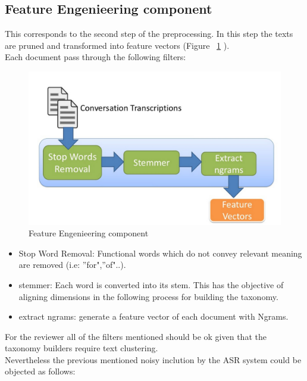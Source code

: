 \documentclass[4pt,a4paper]{article}
\begin{document}
\subsection{Feature Engenieering component}

This corresponds to the second step of the preprocessing. In this step the texts are pruned and transformed into feature vectors (Figure ~\ref{fig:eng_component} ).\\
Each document pass through the following filters:

\begin{figure}[]
  \centering
    \includegraphics[scale=0.2]{pics/eng_component.jpg}
    \caption{Feature Engenieering component}
   \label{fig:eng_component}  
\end{figure}

\begin{itemize}
	\item Stop Word Removal: Functional words which do not convey relevant meaning are removed (i.e: ''for",''of"..).
	
	\item stemmer: Each word is converted into its stem. This has the objective of aligning dimensions in the following process for building the taxonomy.
	
	\item extract ngrams:  generate a feature vector of each document with Ngrams.
\end{itemize}

For the reviewer all of the filters mentioned should be ok given that the taxonomy builders require text clustering.\\
Nevertheless the previous mentioned noisy inclution by the ASR system could be objected as follows:
\end{document}

